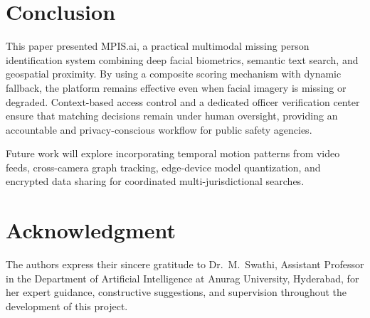\documentclass[conference]{IEEEtran}
\begin{document}
\section{Conclusion}
This paper presented MPIS.ai, a practical multimodal missing person identification system combining deep facial biometrics, semantic text search, and geospatial proximity. By using a composite scoring mechanism with dynamic fallback, the platform remains effective even when facial imagery is missing or degraded. Context-based access control and a dedicated officer verification center ensure that matching decisions remain under human oversight, providing an accountable and privacy-conscious workflow for public safety agencies.

Future work will explore incorporating temporal motion patterns from video feeds, cross-camera graph tracking, edge-device model quantization, and encrypted data sharing for coordinated multi-jurisdictional searches.

\section*{Acknowledgment}
The authors express their sincere gratitude to Dr.~M.~Swathi, Assistant Professor in the Department of Artificial Intelligence at Anurag University, Hyderabad, for her expert guidance, constructive suggestions, and supervision throughout the development of this project.
\end{document}
